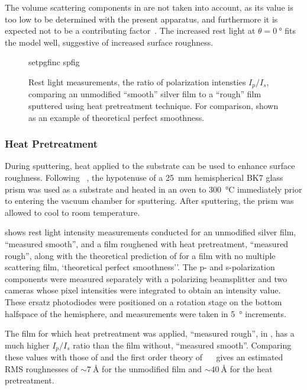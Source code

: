 The volume scattering components in  are not taken
into account, as its value is too low to be determined with the present
apparatus, and furthermore it is expected not to be a contributing
factor~\cite{kretschmann1972decay}.  The increased rest light at
$\theta=\SI{0}{\degree}$ fits the model well, suggestive of increased
surface roughness.
\begin{figure}[ht]
  \centering
  {setpgfinc}
  {spfig}
  \caption{Rest light measurements, the ratio of polarization intensties
    $I_p/I_s$,  comparing an unmodified ``smooth'' silver film
    to a ``rough'' film sputtered using heat pretreatment
    technique.  For comparison,  shown
    as an example of theoretical perfect smoothness.}
  \label{fig:spratio}
\end{figure}

\subsubsection{Heat Pretreatment}
During sputtering, heat applied to the substrate can be used to enhance
surface roughness.  Following ~\cite{horstmann1977multiple},
the hypotenuse of a \SI{25}{\milli\meter} hemispherical BK7 glass prism was
used as a substrate and heated in an oven to \SI{300}{\celsius} immediately prior
to entering the vacuum chamber for sputtering.  After sputtering, the prism
was allowed to cool to room temperature.

 shows rest light intensity measurements conducted for an
unmodified silver film, ``measured smooth'', and a film roughened with heat
pretreatment, ``measured rough'', along with the theoretical prediction of
 for a film with no multiple scattering film,
`theoretical perfect smoothness''.  The p- and s-polarization components were
measured separately with a polarizing beamsplitter and two cameras whose
pixel intensities were integrated to obtain an intensity value.  These ersatz
photodiodes were positioned on a rotation stage on the bottom halfspace of the
hemisphere, and measurements were taken in \SI{5}{\degree} increments.

The film for which heat pretreatment was applied, ``measured rough'', in
, has a much higher $I_p/I_s$ ratio than the film without,
``measured smooth''.  Comparing these values with those of 
and the first order theory of
~\cite{kroger1970scattering}~\cite{horstmann1977multiple} gives
an estimated RMS roughnesses of $\sim\SI{7}{\angstrom}$ for the unmodified
film and $\sim\SI{40}{\angstrom}$ for the heat pretreatment.

